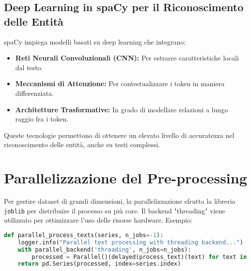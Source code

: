 \subsection{Deep Learning in spaCy per il Riconoscimento delle Entità}
spaCy impiega modelli basati su deep learning che integrano:
\begin{itemize}
    \item \textbf{Reti Neurali Convoluzionali (CNN):} Per estrarre caratteristiche locali dal testo.
    \item \textbf{Meccanismi di Attenzione:} Per contestualizzare i token in maniera differenziata.
    \item \textbf{Architetture Trasformative:} In grado di modellare relazioni a lungo raggio fra i token.
\end{itemize}
Queste tecnologie permettono di ottenere un elevato livello di accuratezza nel riconoscimento delle entità, anche su testi complessi.

\section{Parallelizzazione del Pre-processing}
Per gestire dataset di grandi dimensioni, la parallelizzazione sfrutta la libreria \texttt{joblib} per distribuire il processo su più core. Il backend "threading" viene utilizzato per ottimizzare l'uso delle risorse hardware. Esempio:

\begin{lstlisting}[language=Python,caption={Funzione parallel\_process\_texts}]
def parallel_process_texts(series, n_jobs=-1):
    logger.info("Parallel text processing with threading backend...")
    with parallel_backend('threading', n_jobs=n_jobs):
        processed = Parallel()(delayed(process_text)(text) for text in series)
    return pd.Series(processed, index=series.index)
\end{lstlisting}